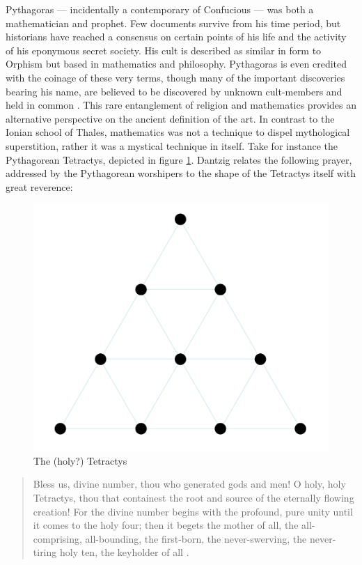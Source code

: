 \documentclass[12pt]{article}
\begin{document}
Pythagoras ---
incidentally a contemporary of Confucious ---
was both a mathematician and prophet.
Few documents survive from his time period,
but historians have reached a consensus on certain points
of his life and the activity
of his eponymous secret society.
His cult is described as similar in form to Orphism
but based in mathematics and philosophy.
Pythagoras is even credited with
the coinage of these very terms,
though many of the important discoveries
bearing his name,
are believed to be discovered by
unknown cult-members and held in common \cite{boyer1991}.
This rare entanglement of religion and mathematics
provides an alternative perspective on
the ancient definition of the art.
In contrast to the Ionian school of Thales,
mathematics was not a technique
to dispel mythological superstition,
rather it was a mystical technique in itself.
Take for instance the Pythagorean Tetractys,
depicted in figure \ref{fig3}.
Dantzig relates the following prayer,
addressed by the Pythagorean worshipers
to the shape of the Tetractys itself
with great reverence:


\begin{figure}
	\includegraphics[scale=0.1]{tetractys.png}
	\centering
	\caption{The (holy?) Tetractys \cite{tetractys}}
	\label{fig3}
\end{figure}

\begin{quote}

	Bless us, divine number, thou who generated gods and men! O holy, holy Tetractys, thou that containest the root and source of the eternally flowing creation! For the divine number begins with the profound, pure unity until it comes to the holy four; then it begets the mother of all, the all-comprising, all-bounding, the first-born, the never-swerving, the never-tiring holy ten, the keyholder of all \cite{dantzig}.

\end{quote}
\end{document}
